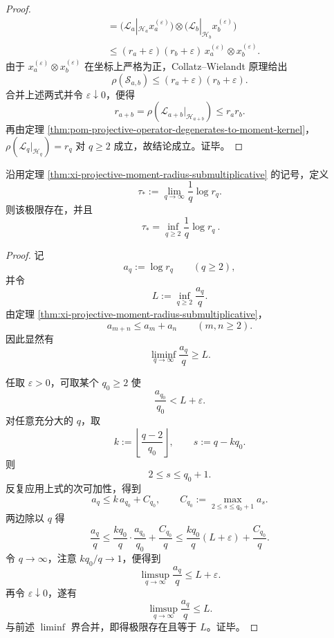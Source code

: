 \begin{proof}
\[\begin{aligned}
&=
\bigl(\mathcal L_a|_{\mathcal H_a}x_a^{(\varepsilon)}\bigr)
\otimes
\bigl(\mathcal L_b|_{\mathcal H_b}x_b^{(\varepsilon)}\bigr)\\
&\le
(r_a+\varepsilon)(r_b+\varepsilon)\,
x_a^{(\varepsilon)}\otimes x_b^{(\varepsilon)}.
\end{aligned}
\]
由于 \(x_a^{(\varepsilon)}\otimes x_b^{(\varepsilon)}\) 在坐标上严格为正，Collatz--Wielandt
原理给出
\[
\rho(\mathcal S_{a,b})\le (r_a+\varepsilon)(r_b+\varepsilon).
\]
合并上述两式并令 \(\varepsilon\downarrow 0\)，便得
\[
r_{a+b}
=
\rho(\mathcal L_{a+b}|_{\mathcal H_{a+b}})
\le
r_a r_b.
\]
再由定理 \ref{thm:pom-projective-operator-degenerates-to-moment-kernel}，
\(
\rho(\mathcal L_q|_{\mathcal H_q})=r_q
\)
对 \(q\ge 2\) 成立，故结论成立。证毕。
\end{proof}

\begin{corollary}\label{cor:xi-projective-moment-fekete-slope}
沿用定理 \ref{thm:xi-projective-moment-radius-submultiplicative} 的记号，定义
\[
\tau_\ast:=\lim_{q\to\infty}\frac{1}{q}\log r_q.
\]
则该极限存在，并且
\[
\boxed{\ \tau_\ast=\inf_{q\ge 2}\frac{1}{q}\log r_q\ }.
\]
\end{corollary}
\begin{proof}
记
\[
a_q:=\log r_q
\qquad(q\ge 2),
\]
并令
\[
L:=\inf_{q\ge 2}\frac{a_q}{q}.
\]
由定理 \ref{thm:xi-projective-moment-radius-submultiplicative}，
\[
a_{m+n}\le a_m+a_n
\qquad(m,n\ge 2).
\]
因此显然有
\[
\liminf_{q\to\infty}\frac{a_q}{q}\ge L.
\]
\par
任取 \(\varepsilon>0\)，可取某个 \(q_0\ge 2\) 使
\[
\frac{a_{q_0}}{q_0}<L+\varepsilon.
\]
对任意充分大的 \(q\)，取
\[
k:=\left\lfloor\frac{q-2}{q_0}\right\rfloor,
\qquad
s:=q-kq_0.
\]
则
\[
2\le s\le q_0+1.
\]
反复应用上式的次可加性，得到
\[
a_q\le k\,a_{q_0}+C_{q_0},
\qquad
C_{q_0}:=\max_{2\le s\le q_0+1}a_s.
\]
两边除以 \(q\) 得
\[
\frac{a_q}{q}
\le
\frac{kq_0}{q}\cdot \frac{a_{q_0}}{q_0}+\frac{C_{q_0}}{q}
\le
\frac{kq_0}{q}(L+\varepsilon)+\frac{C_{q_0}}{q}.
\]
令 \(q\to\infty\)，注意 \(kq_0/q\to 1\)，便得到
\[
\limsup_{q\to\infty}\frac{a_q}{q}\le L+\varepsilon.
\]
再令 \(\varepsilon\downarrow 0\)，遂有
\[
\limsup_{q\to\infty}\frac{a_q}{q}\le L.
\]
与前述 \(\liminf\) 界合并，即得极限存在且等于 \(L\)。证毕。
\end{proof}

